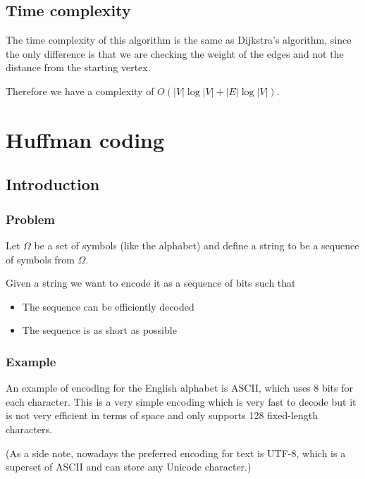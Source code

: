 \documentclass[12pt]{extarticle}
\begin{document}

\subsection{Time complexity}

The time complexity of this algorithm is the same as Dijkstra's algorithm, since the only difference is that we are checking the weight of the edges and not the distance from the starting vertex.

Therefore we have a complexity of $O(|V| \log |V| + |E| \log |V|)$.

\section{Huffman coding}

\subsection{Introduction}

\subsubsection{Problem}

Let $\Omega$ be a set of symbols (like the alphabet) and define a string to be a sequence of symbols from $\Omega$.

Given a string we want to encode it as a sequence of bits such that

\begin{itemize}
    \item The sequence can be efficiently decoded
    \item The sequence is as short as possible
\end{itemize}

\subsubsection{Example}

An example of encoding for the English alphabet is ASCII, which uses 8 bits for each character.
This is a very simple encoding which is very fast to decode but it is not very efficient in terms of space and only supports 128 fixed-length characters.

(As a side note, nowadays the preferred encoding for text is UTF-8, which is a superset of ASCII and can store any Unicode character.)
\end{document}
